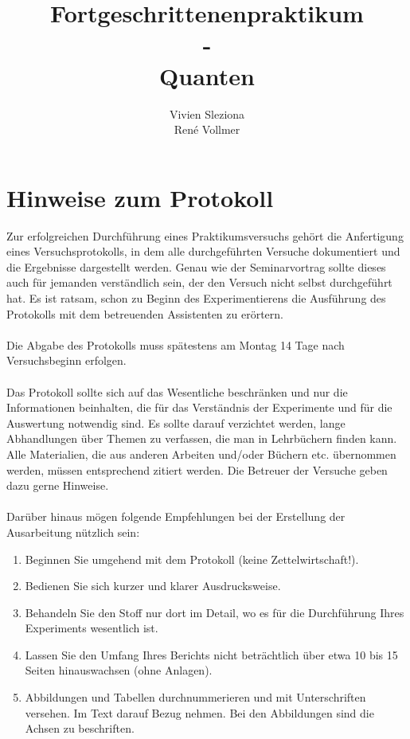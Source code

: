 \documentclass[10pt,a4paper]{article}
\begin{document}

\title{Fortgeschrittenenpraktikum\\ -\\ Quanten }
\author{Vivien Sleziona \\ René Vollmer}

\maketitle
\newpage

\tableofcontents
\vfill
\newpage


\section{Hinweise zum Protokoll}

Zur erfolgreichen Durchführung eines Praktikumsversuchs gehört die Anfertigung eines Versuchsprotokolls, in dem alle durchgeführten Versuche dokumentiert und die Ergebnisse dargestellt werden. Genau wie der Seminarvortrag sollte dieses auch für jemanden verständlich sein, der den Versuch nicht selbst durchgeführt hat. Es ist ratsam, schon zu Beginn des Experimentierens die Ausführung des Protokolls mit dem betreuenden Assistenten zu erörtern.\\
\\
Die Abgabe des Protokolls muss spätestens am Montag 14 Tage nach Versuchsbeginn erfolgen.\\
\\
Das Protokoll sollte sich auf das Wesentliche beschränken und nur die Informationen beinhalten, die für das Verständnis der Experimente und für die Auswertung notwendig sind. Es sollte darauf verzichtet werden, lange Abhandlungen über Themen zu verfassen, die man in Lehrbüchern finden kann. Alle Materialien, die aus anderen Arbeiten und/oder Büchern etc. übernommen werden, müssen entsprechend zitiert werden. Die Betreuer der Versuche geben dazu gerne Hinweise.\\
\\
Darüber hinaus mögen folgende Empfehlungen bei der Erstellung der Ausarbeitung nützlich sein:\\
\begin{enumerate}
\item Beginnen Sie umgehend mit dem Protokoll (keine Zettelwirtschaft!).
\item Bedienen Sie sich kurzer und klarer Ausdrucksweise.
\item Behandeln Sie den Stoff nur dort im Detail, wo es für die Durchführung Ihres Experiments wesentlich ist.
\item Lassen Sie den Umfang Ihres Berichts nicht beträchtlich über etwa 10 bis 15 Seiten hinauswachsen (ohne Anlagen).
\item Abbildungen und Tabellen durchnummerieren und mit Unterschriften versehen. Im Text darauf Bezug nehmen. Bei den Abbildungen sind die Achsen zu beschriften. 
\end{enumerate}
\end{document}
